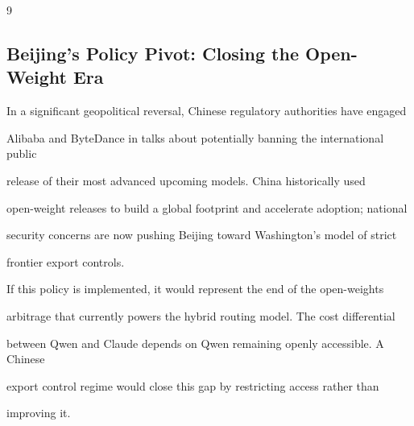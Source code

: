 \documentclass[11pt]{article}
\theoremstyle{definition}
\begin{document}
\begin{thebibliography}{9}
\subsection{Beijing's Policy Pivot: Closing the Open-Weight Era}











In a significant geopolitical reversal, Chinese regulatory authorities have engaged





Alibaba and ByteDance in talks about potentially banning the international public





release of their most advanced upcoming models. China historically used





open-weight releases to build a global footprint and accelerate adoption; national





security concerns are now pushing Beijing toward Washington's model of strict





frontier export controls.











If this policy is implemented, it would represent the end of the open-weights





arbitrage that currently powers the hybrid routing model. The cost differential





between Qwen and Claude depends on Qwen remaining openly accessible. A Chinese





export control regime would close this gap by restricting access rather than





improving it.












\end{thebibliography}
\end{document}
